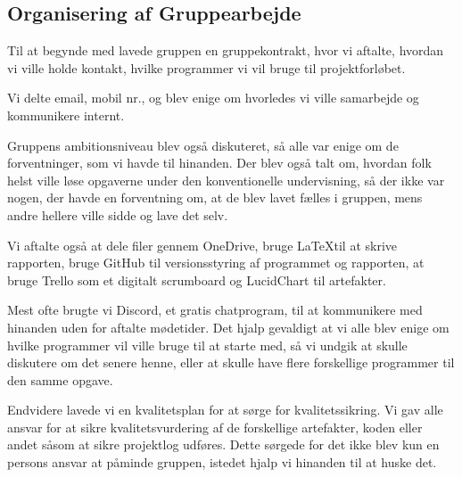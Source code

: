 \subsection{Organisering af Gruppearbejde}

Til at begynde med lavede gruppen en gruppekontrakt, hvor vi aftalte, hvordan vi ville holde kontakt, hvilke programmer vi vil bruge til projektforløbet.

Vi delte email, mobil nr., og blev enige om hvorledes vi ville samarbejde og kommunikere internt.

Gruppens ambitionsniveau blev også diskuteret, så alle var enige om de forventninger, som vi havde til hinanden.
Der blev også talt om, hvordan folk helst ville løse opgaverne under den konventionelle undervisning, så der ikke var nogen, der havde en forventning om, at de blev lavet fælles i gruppen, mens andre hellere ville sidde og lave det selv.

Vi aftalte også at dele filer gennem OneDrive, bruge \LaTeX til at skrive rapporten, bruge GitHub til versionsstyring af programmet og rapporten, at bruge Trello som et digitalt scrumboard og LucidChart til artefakter.

Mest ofte brugte vi Discord, et gratis chatprogram, til at kommunikere med hinanden uden for aftalte mødetider.
Det hjalp gevaldigt at vi alle blev enige om hvilke programmer vil ville bruge til at starte med, så vi undgik at skulle diskutere om det senere henne, eller at skulle have flere forskellige programmer til den samme opgave.

Endvidere lavede vi en kvalitetsplan for at sørge for kvalitetssikring.
Vi gav alle ansvar for at sikre kvalitetsvurdering af de forskellige artefakter, koden eller andet såsom at sikre projektlog udføres.
Dette sørgede for det ikke blev kun en persons ansvar at påminde gruppen, istedet hjalp vi hinanden til at huske det.

